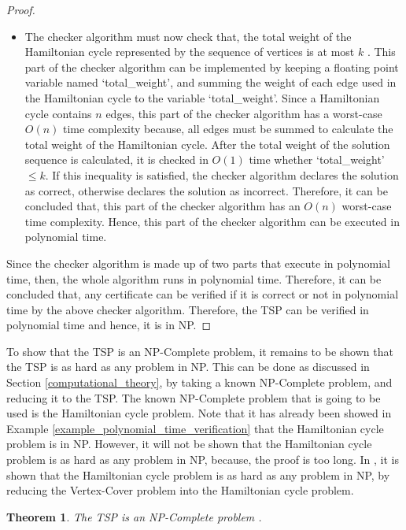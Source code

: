 \documentclass[12pt]{article}
\newtheorem{theorem}[definition]{Theorem}
\numberwithin{equation}{subsection}
\numberwithin{table}{subsection}
\numberwithin{algorithm}{subsection}
\numberwithin{figure}{subsection}
\begin{document}
\begin{proof}
\begin{itemize}
   \item The checker algorithm must now check that, the total weight of the Hamiltonian cycle represented by the sequence of vertices is at most $k$ . This part of the checker algorithm can be implemented by keeping a floating point variable named `total\_weight', and summing the weight of each edge used in the Hamiltonian cycle to the variable `total\_weight'. Since a Hamiltonian cycle contains $n$ edges, this part of the checker algorithm has a worst-case $O(n)$ time complexity because, all edges must be summed to calculate the total weight of the Hamiltonian cycle. After the total weight of the solution sequence is calculated, it is checked in $O(1)$ time whether `total\_weight' $\leq k$. If this inequality is satisfied, the checker algorithm declares the solution as correct, otherwise declares the solution as incorrect. Therefore, it can be concluded that, this part of the checker algorithm has an $O(n)$ worst-case time complexity. Hence, this part of the checker algorithm can be executed in polynomial time.
\end{itemize} 
Since the checker algorithm is made up of two parts that execute in polynomial time, then, the whole algorithm runs in polynomial time. Therefore, it can be concluded that, any certificate can be verified if it is correct or not in polynomial time by the above checker algorithm. Therefore, the TSP can be verified in polynomial time and hence, it is in NP. 
\end{proof}
To show that the TSP is an NP-Complete problem, it remains to be shown that the TSP is as hard as any problem in NP. This can be done as discussed in Section \ref{computational_theory}, by taking a known NP-Complete problem, and reducing it to the TSP. The known NP-Complete problem that is going to be used is the Hamiltonian cycle problem. Note that it has already been showed in Example \ref{example_polynomial_time_verification} that the Hamiltonian cycle problem is in NP. However, it will not be shown that the Hamiltonian cycle problem is as hard as any problem in NP, because, the proof is too long. In \cite{cormen_leiserson_rivest_stein}, it is shown that the Hamiltonian cycle problem is as hard as any problem in NP, by reducing the Vertex-Cover problem into the Hamiltonian cycle problem.
\begin{theorem}
\label{TSP_NP-Complete}
The TSP is an NP-Complete problem {}. 
\end{theorem}
\end{document}

